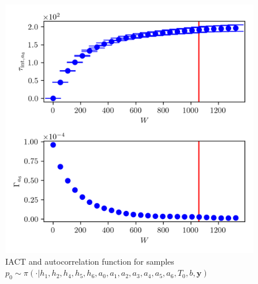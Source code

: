 \begin{figure}[ht!]
	\centering
	\includegraphics{UwerrTauIntTWalk15.png}
	\caption[IACT and autocorrelation function for $p_0$ samples]{IACT and autocorrelation function for samples $p_0 \sim \pi( \cdot | h_1,h_2,h_4,h_5,h_6,a_0,a_1,a_2,a_3,a_4,a_5,a_6,T_0,b, \bm{y})$}
	\label{fig:}
\end{figure}




